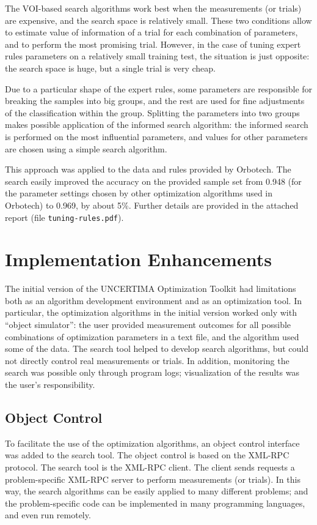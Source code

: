 \documentclass{article}
\begin{document}
The VOI-based search algorithms work best when the measurements (or
trials) are expensive, and the search space is relatively small. These
two conditions allow to estimate value of information of a trial for
each combination of parameters, and to perform the most promising
trial. However, in the case of tuning expert rules parameters on a
relatively small training test, the situation is just opposite: the
search space is huge, but a single trial is very cheap.

Due to a particular shape of the expert rules, some
parameters are responsible for breaking the samples into big groups,
and the rest are used for fine adjustments of the classification
within the group. Splitting the parameters into two groups makes
possible application of the informed search algorithm: the informed
search is performed on the most influential parameters, and values for
other parameters are chosen using a simple search algorithm.

This approach was applied to the data and rules provided by
Orbotech. The search easily improved the accuracy on the provided sample set
from 0.948 (for the parameter settings chosen by other optimization
algorithms used in Orbotech) to 0.969, by about 5\%. 
Further details are provided in the attached report (file {\tt tuning-rules.pdf}).

\section{Implementation Enhancements}

The initial version of the UNCERTIMA Optimization Toolkit had
limitations both as an algorithm development environment and as an
optimization tool. In particular, the optimization algorithms in the
initial version worked only with ``object simulator'': the user
provided measurement outcomes for all possible combinations of
optimization parameters in a text file, and the algorithm used some of
the data. The search tool helped to develop search algorithms, but
could not directly control real measurements or trials. In addition,
monitoring the search was possible only through program
logs; visualization of the results was the user's responsibility.

\subsection{Object Control}

To facilitate the use of the optimization algorithms, an object
control interface was added to the search tool. The object control is
based on the XML-RPC protocol. The search tool is the XML-RPC
client. The client sends requests a problem-specific XML-RPC server to
perform measurements (or trials). In this way, the search algorithms
can be easily applied to many different problems; and the
problem-specific code can be implemented in many programming
languages, and even run remotely. 
\end{document}
